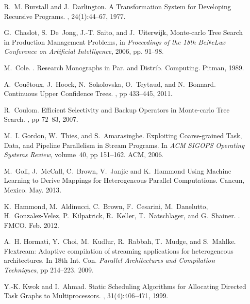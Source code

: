 \documentclass[smallextended]{svjour3}
\begin{document}
\begin{thebibliography}{}
R.~M. Burstall and J.~Darlington.
\newblock A {T}ransformation {S}ystem for {D}eveloping {R}ecursive {P}rograms.
, 24(1):44--67, 1977.

G.~Chaslot, S.~De~Jong, J.-T. Saito, and J.~Uiterwijk, Monte-carlo Tree
 Search in Production Management Problems, in \emph{Proceedings of the 18th
 BeNeLux Conference on Artificial Intelligence}, 2006, pp. 91--98.
 
M.~Cole.
.
\newblock Research Monographs in Par. and Distrib. Computing. Pitman, 1989.
 
A.~Cou{\"e}toux, J.~Hoock, N.~Sokolovska, O.~Teytaud, and N.~Bonnard.
\newblock Continuous Upper Confidence Trees.
, pp 433--445, 2011.

R.~Coulom.
\newblock Efficient Selectivity and Backup Operators in Monte-carlo Tree
  Search.
, pp 72--83, 2007.

M.~I. Gordon, W.~Thies, and S.~Amarasinghe.
\newblock Exploiting Coarse-grained Task, Data, and Pipeline Parallelism in
  Stream Programs.
\newblock In {\em ACM SIGOPS Operating Systems Review}, volume~40, pp
  151--162. ACM, 2006.

M.~Goli, J.~McCall, C.~Brown, V.~Janjic and K.~Hammond
\newblock Using Machine Learning to Derive Mappings for Heterogeneous Parallel Computations.
 Cancun, Mexico. May. 2013. 

K.~Hammond, M.~Aldinucci, C.~Brown, F.~Cesarini, M.~Danelutto,
  H.~Gonzalez-Velez, P.~Kilpatrick, R.~Keller, T.~Natschlager, and G.~Shainer.
.
\newblock FMCO. Feb. 2012.

A.~H. Hormati, Y.~Choi, M.~Kudlur, R.~Rabbah, T.~Mudge, and S.~Mahlke.
\newblock Flextream: Adaptive compilation of streaming applications for
  heterogeneous architectures.
\newblock In {18th Int. Con. \em Parallel Architectures and Compilation Techniques}, pp 214--223. 2009.

Y.-K. Kwok and I.~Ahmad.
\newblock Static Scheduling Algorithms for Allocating Directed Task Graphs to
  Multiprocessors.
, 31(4):406--471, 1999.


\end{thebibliography}
\end{document}
